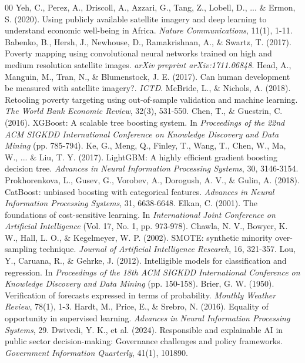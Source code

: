 \documentclass[conference]{IEEEtran}
\begin{document}
\begin{thebibliography}{00}
 Yeh, C., Perez, A., Driscoll, A., Azzari, G., Tang, Z., Lobell, D., ... \& Ermon, S. (2020). Using publicly available satellite imagery and deep learning to understand economic well-being in Africa. \textit{Nature Communications}, 11(1), 1-11.
 Babenko, B., Hersh, J., Newhouse, D., Ramakrishnan, A., \& Swartz, T. (2017). Poverty mapping using convolutional neural networks trained on high and medium resolution satellite images. \textit{arXiv preprint arXiv:1711.06848}.
 Head, A., Manguin, M., Tran, N., \& Blumenstock, J. E. (2017). Can human development be measured with satellite imagery?. \textit{ICTD}.
 McBride, L., \& Nichols, A. (2018). Retooling poverty targeting using out-of-sample validation and machine learning. \textit{The World Bank Economic Review}, 32(3), 531-550.
 Chen, T., \& Guestrin, C. (2016). XGBoost: A scalable tree boosting system. In \textit{Proceedings of the 22nd ACM SIGKDD International Conference on Knowledge Discovery and Data Mining} (pp. 785-794).
 Ke, G., Meng, Q., Finley, T., Wang, T., Chen, W., Ma, W., ... \& Liu, T. Y. (2017). LightGBM: A highly efficient gradient boosting decision tree. \textit{Advances in Neural Information Processing Systems}, 30, 3146-3154.
 Prokhorenkova, L., Gusev, G., Vorobev, A., Dorogush, A. V., \& Gulin, A. (2018). CatBoost: unbiased boosting with categorical features. \textit{Advances in Neural Information Processing Systems}, 31, 6638-6648.
 Elkan, C. (2001). The foundations of cost-sensitive learning. In \textit{International Joint Conference on Artificial Intelligence} (Vol. 17, No. 1, pp. 973-978).
 Chawla, N. V., Bowyer, K. W., Hall, L. O., \& Kegelmeyer, W. P. (2002). SMOTE: synthetic minority over-sampling technique. \textit{Journal of Artificial Intelligence Research}, 16, 321-357.
 Lou, Y., Caruana, R., \& Gehrke, J. (2012). Intelligible models for classification and regression. In \textit{Proceedings of the 18th ACM SIGKDD International Conference on Knowledge Discovery and Data Mining} (pp. 150-158).
 Brier, G. W. (1950). Verification of forecasts expressed in terms of probability. \textit{Monthly Weather Review}, 78(1), 1-3.
 Hardt, M., Price, E., \& Srebro, N. (2016). Equality of opportunity in supervised learning. \textit{Advances in Neural Information Processing Systems}, 29.
 Dwivedi, Y. K., et al. (2024). Responsible and explainable AI in public sector decision-making: Governance challenges and policy frameworks. \textit{Government Information Quarterly}, 41(1), 101890.

\end{thebibliography}
\end{document}
